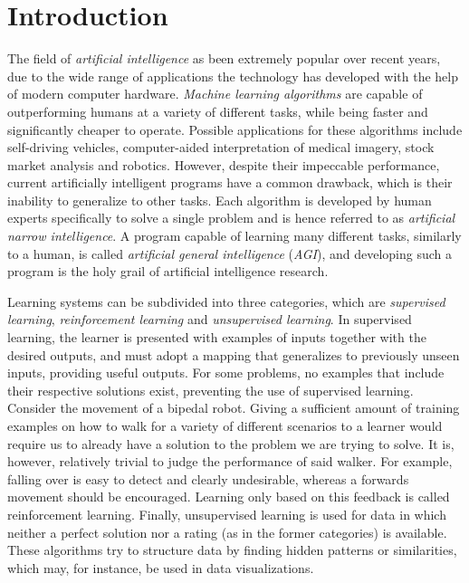\section{Introduction}
The field of \textit{artificial intelligence} as been extremely popular over recent years, due to the wide range of applications the technology has developed with the help of modern computer hardware. \textit{Machine learning algorithms} are capable of outperforming humans at a variety of different tasks, while being faster and significantly cheaper to operate. Possible applications for these algorithms include self-driving vehicles, computer-aided interpretation of medical imagery, stock market analysis and robotics. However, despite their impeccable performance, current artificially intelligent programs have a common drawback, which is their inability to generalize to other tasks. Each algorithm is developed by human experts specifically to solve a single problem and is hence referred to as \textit{artificial narrow intelligence}. A program capable of learning many different tasks, similarly to a human, is called \textit{artificial general intelligence} (\textit{AGI}), and developing such a program is the holy grail of artificial intelligence research.

Learning systems can be subdivided into three categories, which are \textit{supervised learning}, \textit{reinforcement learning} and \textit{unsupervised learning}. In supervised learning, the learner is presented with examples of inputs together with the desired outputs, and must adopt a mapping that generalizes to previously unseen inputs, providing useful outputs. For some problems, no examples that include their respective solutions exist, preventing the use of supervised learning. Consider the movement of a bipedal robot. Giving a sufficient amount of training examples on how to walk for a variety of different scenarios to a learner would require us to already have a solution to the problem we are trying to solve. It is, however, relatively trivial to judge the performance of said walker. For example, falling over is easy to detect and clearly undesirable, whereas a forwards movement should be encouraged. Learning only based on this feedback is called reinforcement learning. Finally, unsupervised learning is used for data in which neither a perfect solution nor a rating (as in the former categories) is available. These algorithms try to structure data by finding hidden patterns or similarities, which may, for instance, be used in data visualizations.


